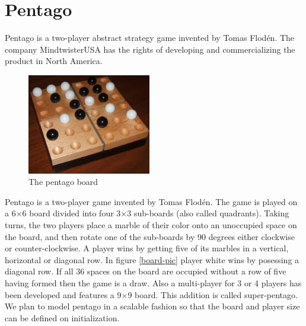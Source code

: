 \section{Pentago}
\label{Pentago}

Pentago is a two-player abstract strategy game invented by Tomas Flodén. The company MindtwisterUSA \cite{MindTwisterUSA} has the rights of developing and commercializing the product in North America. %


\begin{figure}
  \begin{center}
    \includegraphics[width=0.48\textwidth]{Images/Pentago-Game-Winning-Position.jpg}
  \end{center}
  \caption{The pentago board}
  \label{fig:boardpic}
\end{figure}

\vspace{6pt}

Pentago is a two-player game invented by Tomas Flodén. The game is played on a 6×6 board divided into four 3×3 sub-boards (also called quadrants). Taking turns, the two players place a marble of their color onto an unoccupied space on the board, and then rotate one of the sub-boards by 90 degrees either clockwise or counter-clockwise. A player wins by getting five of its marbles in a vertical, horizontal or diagonal row. In figure \ref{board-pic} player white wins by posessing a diagonal row. If all 36 spaces on the board are occupied without a row of five having formed then the game is a draw. Also a multi-player for 3 or 4 players has been developed and features a 9×9 board. This addition is called super-pentago. We plan to model pentago in a scalable fashion so that the board and player size can be defined on initialization.
